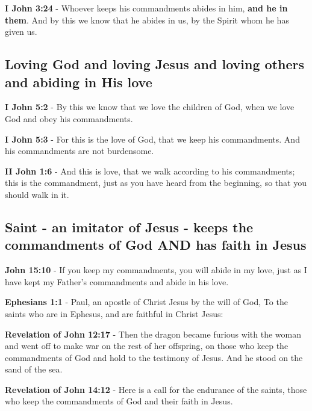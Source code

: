\documentclass[11pt]{article}
\begin{document}
\textbf{I John 3:24} - Whoever keeps his commandments abides in him, \textbf{and he in them}. And by this we know that he abides in us, by the Spirit whom he has given us.

\subsection{Loving God and loving Jesus and loving others and abiding in His love}
\label{sec:org07cd6a4}
\textbf{I John 5:2} - By this we know that we love the children of God, when we love God and obey his commandments.

\textbf{I John 5:3} - For this is the love of God, that we keep his commandments. And his commandments are not burdensome.

\textbf{II John 1:6} - And this is love, that we walk according to his commandments; this is the commandment, just as you have heard from the beginning, so that you should walk in it.

\subsection{Saint - an imitator of Jesus - keeps the commandments of God AND has faith in Jesus}
\label{sec:org967391b}
\textbf{John 15:10} - If you keep my commandments, you will abide in my love, just as I have kept my Father's commandments and abide in his love.

\textbf{Ephesians 1:1} - Paul, an apostle of Christ Jesus by the will of God, To the saints who are in Ephesus, and are faithful in Christ Jesus:

\textbf{Revelation of John 12:17} - Then the dragon became furious with the woman and went off to make war on the rest of her offspring, on those who keep the commandments of God and hold to the testimony of Jesus. And he stood on the sand of the sea.

\textbf{Revelation of John 14:12} - Here is a call for the endurance of the saints, those who keep the commandments of God and their faith in Jesus.
\end{document}
